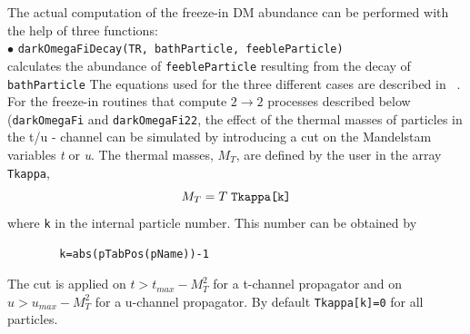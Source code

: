 \documentclass[12pt,a4paper]{article}
\begin{document}
The actual computation of the freeze-in DM abundance can be performed with the help of three functions:\\
\noindent
$\bullet$ \verb|darkOmegaFiDecay(TR, bathParticle, feebleParticle) | \\
calculates the abundance of {\tt feebleParticle} resulting  from the  decay of {\tt bathParticle}
The equations used for the three different cases are described in ~\cite{Belanger:2018ccd}.\\

 
 For the freeze-in routines that compute $2\rightarrow 2$ processes described below ({\tt darkOmegaFi} and {\tt darkOmegaFi22}, the effect of the thermal masses of particles in the t/u - channel can be simulated by  introducing a cut on the Mandelstam variables {\it t} or {\it u}.
The thermal masses, $M_T$, are defined by the user in the array {\tt Tkappa}, 
\begin{equation}
     M_T = T \; \verb|Tkappa[k]|    
\end{equation}
where  {\tt k} in the  internal particle  number. This number can be  obtained by 
\begin{verbatim}
        k=abs(pTabPos(pName))-1
\end{verbatim}        
The  cut  is applied on 
$ t>  t_{max}- M_T^2 $ for a  t-channel propagator and on $ u> u_{max}- M_T^2$ for a u-channel propagator. By default {\tt Tkappa[k]=0}  for all particles.      \\
\end{document}

